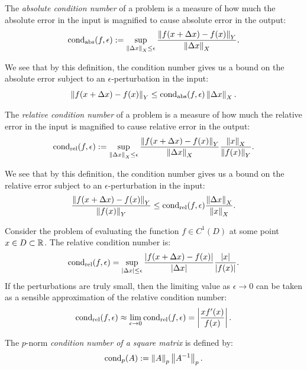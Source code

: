 \begin{definition}
The {\em absolute condition number} of a problem is a measure of how much the absolute error in the input is magnified to cause absolute error in the output:
\begin{equation}
\operatorname{cond}_{\rm abs}(f,\epsilon) := \sup_{\left\|{\Delta x}\right\|_X \le \epsilon}\dfrac{\left\|{f(x+\Delta x)-f(x)}\right\|_Y}{\left\|{\Delta x}\right\|_X}.
\end{equation}
\end{definition}
We see that by this definition, the condition number gives us a bound on the absolute error subject to an $\epsilon$-perturbation in the input:
\begin{equation}
\left\|{f(x+\Delta x)-f(x)}\right\|_Y \le \operatorname{cond}_{\rm abs}(f,\epsilon)\left\|{\Delta x}\right\|_X.
\end{equation}

\begin{definition}
The {\em relative condition number} of a problem is a measure of how much the relative error in the input is magnified to cause relative error in the output:
\begin{equation}
\operatorname{cond}_{\rm rel}(f,\epsilon) := \sup_{\left\|{\Delta x}\right\|_X \le \epsilon}\dfrac{\left\|{f(x+\Delta x)-f(x)}\right\|_Y}{\left\|{\Delta x}\right\|_X}\dfrac{\left\|{x}\right\|_X}{\left\|{f(x)}\right\|_Y}.
\end{equation}
\end{definition}
We see that by this definition, the condition number gives us a bound on the relative error subject to an $\epsilon$-perturbation in the input:
\begin{equation}
\dfrac{\left\|{f(x+\Delta x)-f(x)}\right\|_Y}{\left\|{f(x)}\right\|_Y} \le \operatorname{cond}_{\rm rel}(f,\epsilon)\dfrac{\left\|{\Delta x}\right\|_X}{\left\|{x}\right\|_X}.
\end{equation}

\begin{example}
Consider the problem of evaluating the function $f\in C^1(D)$ at some point $x\in D\subset\mathbb{R}$. The relative condition number is:
\[
\operatorname{cond}_{\rm rel}(f,\epsilon) = \sup_{\left|{\Delta x}\right| \le \epsilon}\dfrac{\left|{f(x+\Delta x)-f(x)}\right|}{\left|{\Delta x}\right|}\dfrac{\left|{x}\right|}{\left|{f(x)}\right|}.
\]
If the perturbations are truly small, then the limiting value as $\epsilon\to0$ can be taken as a sensible approximation of the relative condition number:
\[
\operatorname{cond}_{\rm rel}(f,\epsilon) \approx \lim_{\epsilon\to0} \operatorname{cond}_{\rm rel}(f,\epsilon) = \left|{\dfrac{xf'(x)}{f(x)}}\right|.
\]
\end{example}

\begin{definition}
The $p$-norm {\em condition number of a square matrix} is defined by:
\begin{equation}
\operatorname{cond}_p(A) := \left\|{A}\right\|_p\left\|{A^{-1}}\right\|_p.
\end{equation}
\end{definition}

